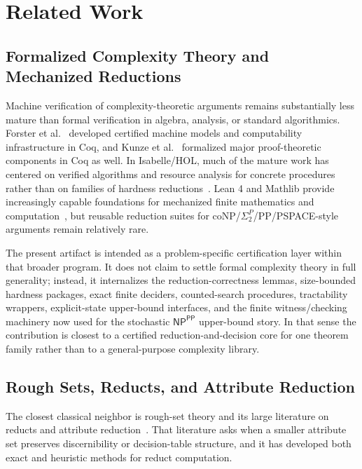 \section{Related Work}\label{sec:related}

\subsection{Formalized Complexity Theory and Mechanized Reductions}

Machine verification of complexity-theoretic arguments remains substantially less mature than formal verification in algebra, analysis, or standard algorithmics. Forster et al.~\cite{forster2019verified} developed certified machine models and computability infrastructure in Coq, and Kunze et al.~\cite{kunze2019formal} formalized major proof-theoretic components in Coq as well. In Isabelle/HOL, much of the mature work has centered on verified algorithms and resource analysis for concrete procedures rather than on families of hardness reductions~\cite{nipkow2002isabelle,haslbeck2021verified}. Lean 4 and Mathlib provide increasingly capable foundations for mechanized finite mathematics and computation~\cite{mathlib2020,moura2021lean4}, but reusable reduction suites for coNP/$\Sigma_2^P$/PP/PSPACE-style arguments remain relatively rare.

The present artifact is intended as a problem-specific certification layer within that broader program. It does not claim to settle formal complexity theory in full generality; instead, it internalizes the reduction-correctness lemmas, size-bounded hardness packages, exact finite deciders, counted-search procedures, tractability wrappers, explicit-state upper-bound interfaces, and the finite witness/checking machinery now used for the stochastic $\textsf{NP}^{\textsf{PP}}$ upper-bound story. In that sense the contribution is closest to a certified reduction-and-decision core for one theorem family rather than to a general-purpose complexity library.

\subsection{Rough Sets, Reducts, and Attribute Reduction}
 
The closest classical neighbor is rough-set theory and its large literature on reducts and attribute reduction~\cite{pawlak1982rough,jensen2004semantics,jensen2008rough}. That literature asks when a smaller attribute set preserves discernibility or decision-table structure, and it has developed both exact and heuristic methods for reduct computation.

